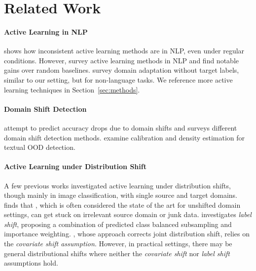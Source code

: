 

\section{Related Work}
\respace
\label{sec:relatedwork}

\paragraph{Active Learning in NLP}
\citet{lowell2019practical} shows how inconsistent active learning methods are in NLP, even under regular conditions. 
However, \citet{dor2020active, siddhant-lipton-2018-deep} survey active learning methods in NLP and find notable gains over random baselines.
\citet{kouw2019review} survey domain adaptation without target labels, similar to our setting, but for non-language tasks.
We reference more active learning techniques in Section~\ref{sec:methods}.

\respace
\paragraph{Domain Shift Detection}
\citet{elsahar-galle-2019-annotate} attempt to predict accuracy drops due to domain shifts and \citet{rabanser2018failing} surveys different domain shift detection methods. 
\citet{arora2021types} examine calibration and density estimation for textual OOD detection.

\respace
\paragraph{Active Learning under Distribution Shift}
A few previous works investigated active learning under distribution shifts, though mainly in image classification, with single source and target domains.
\citet{kirsch2021active} finds that \bald{}, which is often considered the state of the art for unshifted domain settings, can get stuck on irrelevant source domain or junk data. 
\citet{pmlr-v130-zhao21b} investigates \emph{label shift}, proposing a combination of predicted class balanced subsampling and importance weighting. 
\citet{10.1007/978-3-642-23808-6_7}, whose approach corrects joint distribution shift, relies on the \emph{covariate shift assumption}. 
However, in practical settings, there may be general distributional shifts where neither the \emph{covariate shift} nor \emph{label shift} assumptions hold.

